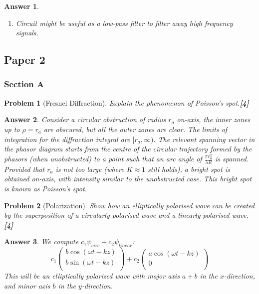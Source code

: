 \documentclass[a4paper]{article}
\newtheorem{ans}{Answer}[subsection]
\theoremstyle{new}
\newtheorem{qns}{Problem}[subsection]
\begin{document}
\begin{ans}
\begin{enumerate}[label=(\roman*)]
The sketches will be: the phase increase from 0 at $\omega=0$, to $\frac{\pi}{2}$ at $\omega=10^4$, and then approaches $\pi$; the amplitude will decrease from 5 at $\omega=0$ (maximum) and decays to zero as $\omega\rightarrow\infty$.
\item Circuit might be useful as a low-pass filter to filter away high frequency signals.
\end{enumerate}
\end{ans}
\newpage
\subsection{Paper 2}
\subsubsection{Section A}
\begin{qns}[Fresnel Diffraction]
Explain the phenomenon of Poisson’s spot.\hfill\textbf{[4]}
\end{qns}
\begin{ans}
Consider a circular obstruction of radius $r_a$ on-axis, the inner zones up to $\rho=r_a$ are obscured, but all the outer zones are clear. The limits of integration for the diffraction integral are $[r_a,\infty)$. The relevant spanning vector in the phasor diagram starts from the centre of the circular trajectory formed by the phasors (when unobstructed) to a point such that an arc angle of $\frac{\pi r_a^2}{\lambda R}$ is spanned. Provided that $r_a$ is not too large (where $K\approx 1$ still holds), a bright spot is obtained on-axis, with intensity similar to the unobstructed case. This bright spot is known as Poisson's spot.
\end{ans}
\begin{qns}[Polarization]
Show how an elliptically polarised wave can be created by the superposition of a circularly polarised wave and a linearly polarised wave.\hfill\textbf{[4]}
\end{qns}
\begin{ans}
We compute $c_1\psi_{circ}+c_2\psi_{linear}$:
$$c_1\begin{pmatrix}b\cos(\omega t-kz)\\b\sin(\omega t-kz)\\\end{pmatrix}+c_2\begin{pmatrix}a\cos(\omega t-kz)\\0\\\end{pmatrix}$$
This will be an elliptically polarized wave with major axis $a+b$ in the $x$-direction, and minor axis $b$ in the $y$-direction.
\end{ans}
\end{document}
